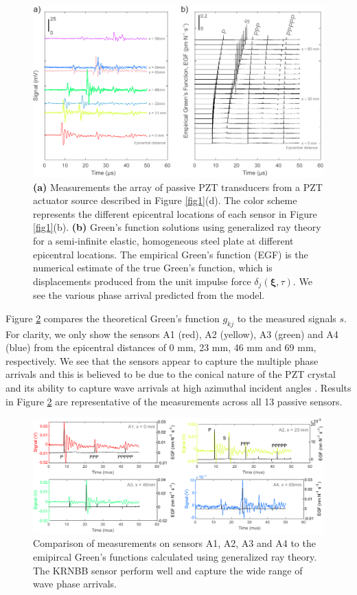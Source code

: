 \documentclass[preprint,3p, 11pt,authoryear]{elsarticle}
\begin{document}
{\begin{figure}[ht]
     	\centering
\includegraphics[scale= 1.0]{FIG3.pdf} 
\caption{\textbf{(a)} Measurements the array of passive PZT transducers from a PZT actuator source described in Figure \ref{fig1}(d). The color scheme represents the different epicentral locations of each sensor in Figure \ref{fig1}(b).  \textbf{(b)} Green's function solutions using generalized ray theory for a semi-infinite elastic, homogeneous steel plate at different epicentral locations.  The empirical Green's function (EGF) is the numerical estimate of the true Green's function, which is displacements produced from the unit impulse force $\delta_{j}(\mathbf{\xi}, \tau)$. We see the various phase arrival predicted from the model.}
	\label{fig3} 
\end{figure}

Figure \ref{fig4} compares the theoretical Green's function $g_{kj}$ to the measured signals $s$.  For clarity, we only show the sensors A1 (red), A2 (yellow), A3 (green) and A4 (blue) from the epicentral distances of 0 mm, 23 mm, 46 mm and 69 mm, respectively. We see that the sensors appear to capture the multiple phase arrivals and this is believed to be due to the conical nature of the PZT crystal and its ability to capture wave arrivals at high azimuthal incident angles \citep{Selvadurai2019}. Results in Figure \ref{fig4} are representative of the measurements across all 13 passive sensors.

\begin{figure}[ht]
     	\centering
\includegraphics[scale= 0.90]{FIG4.pdf} 
\caption{Comparison of measurements on sensors A1, A2, A3 and A4 to the emipircal Green's functions calculated using generalized ray theory. The KRNBB sensor perform well and capture the wide range of wave phase arrivals.}
	\label{fig4} 
\end{figure}

}
\end{document}
